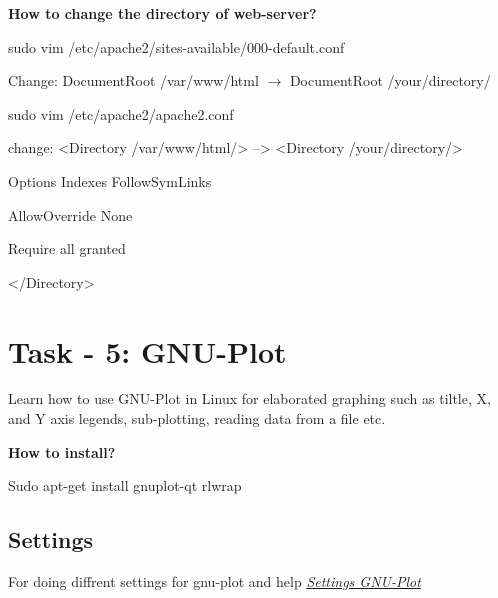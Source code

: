 \documentclass[letterpaper,10pt,english]{sphinxmanual}
\begin{document}
\textbf{How to change the directory of web-server?}

sudo vim /etc/apache2/sites-available/000-default.conf

Change: DocumentRoot /var/www/html \(\rightarrow\) DocumentRoot /your/directory/

sudo vim /etc/apache2/apache2.conf

change: \textless{}Directory /var/www/html/\textgreater{}  –\textgreater{} \textless{}Directory /your/directory/\textgreater{}

Options Indexes FollowSymLinks

AllowOverride None

Require all granted

\textless{}/Directory\textgreater{}


\section{Task - 5: GNU-Plot}
\label{week-07:task-5-gnu-plot}
Learn how to use GNU-Plot in Linux for elaborated graphing such as tiltle, X, and Y axis legends, sub-plotting, reading data from a file etc.

\textbf{How to install?}

Sudo apt-get install gnuplot-qt rlwrap


\subsection{Settings}
\label{week-07:settings}
For doing diffrent settings for gnu-plot and help {\hyperref[appendix:gnu-plot]{\emph{Settings GNU-Plot}}}
\end{document}
